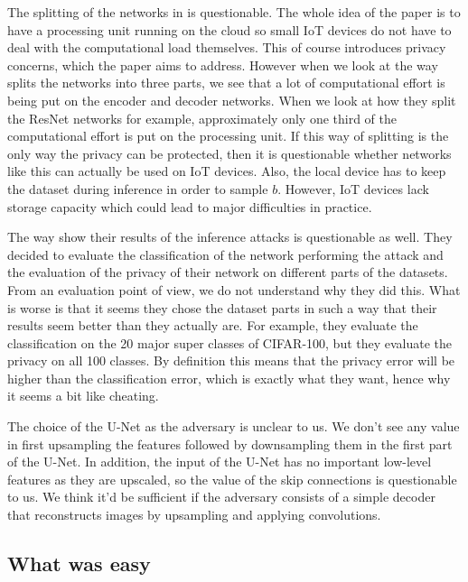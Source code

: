 The splitting of the networks in \cite{xiang2020interpretable} is questionable. The whole idea of the paper is to have a processing unit running on the cloud so small IoT devices do not have to deal with the computational load themselves. This of course introduces privacy concerns, which the paper aims to address. However when we look at the way \cite{xiang2020interpretable} splits the networks into three parts, we see that a lot of computational effort is being put on the encoder and decoder networks. When we look at how they split the ResNet networks for example, approximately only one third of the computational effort is put on the processing unit. If this way of splitting is the only way the privacy can be protected, then it is questionable whether networks like this can actually be used on IoT devices. Also, the local device has to keep the dataset during inference in order to sample $b$. However, IoT devices lack storage capacity which could lead to major difficulties in practice.

The way \cite{xiang2020interpretable} show their results of the inference attacks is questionable as well. They decided to evaluate the classification of the network performing the attack and the evaluation of the privacy of their network on different parts of the datasets. From an evaluation point of view, we do not understand why they did this. What is worse is that it seems they chose the dataset parts in such a way that their results seem better than they actually are. For example, they evaluate the classification on the 20 major super classes of CIFAR-100, but they evaluate the privacy on all 100 classes. By definition this means that the privacy error will be higher than the classification error, which is exactly what they want, hence why it seems a bit like cheating.

The choice of the U-Net as the adversary is unclear to us. We don't see any value in first upsampling the features followed by downsampling them in the first part of the U-Net. In addition, the input of the U-Net has no important low-level features as they are upscaled, so the value of the skip connections is questionable to us. We think it'd be sufficient if the adversary consists of a simple decoder that reconstructs images by upsampling and applying convolutions.

\subsection{What was easy}

